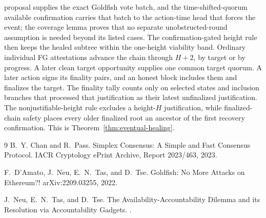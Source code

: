 proposal supplies the exact Goldfish vote batch, and the time-shifted-quorum
available confirmation carries that batch to the action-time head that forces
the event; the coverage lemma proves that no separate unobstructed-round
assumption is needed beyond its listed cases.
The confirmation-gated height rule then keeps the healed subtree within the
one-height viability band.  Ordinary individual FG attestations advance the
chain through \(H+2\), by target or by progress.  A later clean target
opportunity supplies one common target quorum.  A later action signs its
finality pairs, and an honest block includes them and finalizes the target.  The
finality tally counts only on selected states and inclusion branches that processed that justification as their
latest unfinalized justification.  The nonjustifiable-height rule excludes a
height-\(H\) justification, while finalized-chain safety places every older
finalized root an ancestor of the first recovery confirmation.  This is
Theorem~\ref{thm:eventual-healing}.

\begin{thebibliography}{9}
B.~Y. Chan and R.~Pass.
\newblock Simplex Consensus: A Simple and Fast Consensus Protocol.
\newblock IACR Cryptology ePrint Archive, Report 2023/463, 2023.

F.~D'Amato, J.~Neu, E.~N.~Tas, and D.~Tse.
\newblock Goldfish: No More Attacks on Ethereum?!
\newblock arXiv:2209.03255, 2022.

J.~Neu, E.~N.~Tas, and D.~Tse.
\newblock The Availability-Accountability Dilemma and its Resolution via
Accountability Gadgets.
.
\end{thebibliography}
